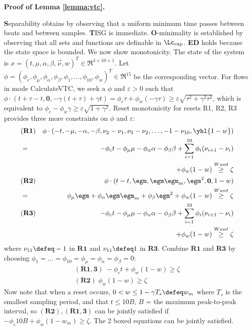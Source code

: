 {\large \textbf{Proof of Lemma \ref{lemma:vtc}.}}
\begin{prf}
\textbf{S}eparability obtains by observing that a uniform minimum time passes between beats and between samples. 
\textbf{T}ISG is immediate.
\textbf{O}-minimality is established by observing that all sets and functions are definable in $\Lc_{\exp}$. \textbf{ED} holds because the state space is bounded.
We now show monotonicity.
The state of the system is $x = (t , \mu ,\alpha, \beta , \vec{\nu}, w)^T \in \Re^{4+10+1}$.
Let $\phi = (\phi_c,\phi_\mu,\phi_\alpha,\phi_\beta,\phi_1,\ldots,\phi_{10},\phi_w)^T \in \Re^{15}$ be the corresponding vector.
For flows in mode CalculateVTC, we seek a $\phi$ and $\varepsilon > 0$ such that 
$\phi \cdot (t+\tau -  t , \mathbf{0} , -\gamma(t+\tau) + \gamma t) = \phi_c \tau + \phi_w(-\gamma \tau) \geq \varepsilon \sqrt{\tau^2 + \gamma^2\tau^2}$,
which is equivalent to 
$\boxed{\phi_c - \phi_w\gamma \geq \varepsilon \sqrt{1 + \gamma^2}}$.
Reset monotonicity for resets R1, R2, R3 provides three more constraints on $\phi$ and $\varepsilon$:
\begin{eqnarray*}
&\mathbf{(R1)} &
\phi \cdot (-t, -\mu , -\alpha , -\beta ,\nu_2 - \nu_1 , \nu_3 - \nu_2 , \ldots , -1 - \nu_{10}, \yhl{1-w})
\\	
&=& -\phi_c t -\phi_\mu \mu -\phi_\alpha \alpha - \phi_\beta \beta + \sum_{i=1}^{10}\phi_i(\nu_{i+1}-\nu_i) 
\\
&&+ \phi_w(1-w) \stackrel{Want}{\geq} \zeta
%
%
\\
%
%
&\mathbf{(R2)} &
\phi \cdot (t-t , \egm , \egm \egm_m, \egm^2 , \mathbf{0} , 1-w)
\\
&=& \phi_\mu \egm + \phi_\alpha \egm \egm_m+ \phi_\beta \egm^2 + \phi_w (1-w) \stackrel{Want}{\geq} \zeta
%
%
\\ 
&\mathbf{(R3)} &
 -\phi_c t -\phi_\mu \mu -\phi_\alpha \alpha - \phi_\beta \beta + \sum_{i=1}^{10}\phi_i (\nu_{i+1}-\nu_i) 
 \\
 && + \phi_w(1-w) \stackrel{Want}{\geq} \zeta
\end{eqnarray*}
where $\nu_{11} \defeq -1$ in $\mathbf{R1}$ and $\nu_{11}\defeq 1$ in $\mathbf{R3}$.
%
Combine $\mathbf{R1}$ and $\mathbf{R3}$ by choosing $\phi_1 = \ldots = \phi_{10}=\phi_\mu = \phi_\alpha = \phi_\beta = 0$:
\begin{eqnarray*}
\label{eq:R23}
\mathbf{(R1,3)}\; -\phi_c t + \phi_w(1-w) \geq \zeta
\\
\mathbf{(R2)}\; \phi_w(1-w) \geq \zeta
\end{eqnarray*}
Now note that when a reset occurs, $0<w \leq 1-\gamma T_s \defeq w_m$ where $T_s$ is the smallest sampling period, and that $t\leq 10B$, $B$ = the maximum peak-to-peak interval, so $\mathbf{(R2)} ,\mathbf{(R1,3)} $ can be jointly satisfied if $\boxed{-\phi_c10B + \phi_w(1-w_m) \geq \zeta}$.
The 2 boxed equations can be jointly satisfied.
	\end{prf}